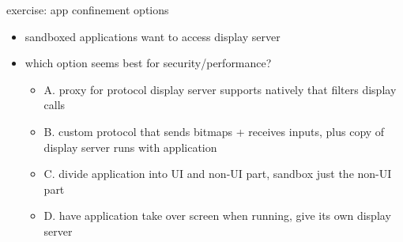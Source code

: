 \begin{frame}{exercise: app confinement options}
    \begin{itemize}
    \item sandboxed applications want to access display server
    \item which option seems best for security/performance?
    \begin{itemize}
    \item A. proxy for protocol display server supports natively that filters display calls
    \item B. custom protocol that sends bitmaps + receives inputs, plus copy of display server runs with application
    \item C. divide application into UI and non-UI part, sandbox just the non-UI part
    \item D. have application take over screen when running, give its own display server
    \end{itemize}
    \end{itemize}
\end{frame}
